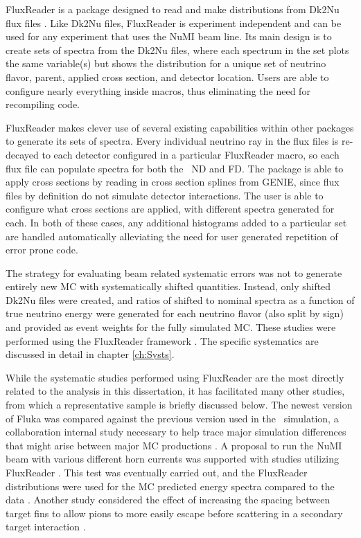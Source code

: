 FluxReader is a package designed to read and make distributions from Dk2Nu flux files \cite{ref:TNFR}. Like Dk2Nu files, FluxReader is experiment independent and can be used for any experiment that uses the NuMI beam line. Its main design is to create sets of spectra from the Dk2Nu files, where each spectrum in the set plots the same variable(s) but shows the distribution for a unique set of neutrino flavor, parent, applied cross section, and detector location. Users are able to configure nearly everything inside macros, thus eliminating the need for recompiling code.

FluxReader makes clever use of several existing capabilities within other packages to generate its sets of spectra. Every individual neutrino ray in the flux files is re-decayed to each detector configured in a particular FluxReader macro, so each flux file can populate spectra for both the \nova~ND and FD. The package is able to apply cross sections by reading in cross section splines from GENIE, since flux files by definition do not simulate detector interactions. The user is able to configure what cross sections are applied, with different spectra generated for each. In both of these cases, any additional histograms added to a particular set are handled automatically alleviating the need for user generated repetition of error prone code.

The strategy for evaluating beam related systematic errors was not to generate entirely new MC with systematically shifted quantities. Instead, only shifted Dk2Nu files were created, and ratios of shifted to nominal spectra as a function of true neutrino energy were generated for each neutrino flavor (also split by sign) and provided as event weights for the fully simulated MC. These studies were performed using the FluxReader framework \cite{ref:TNBeam}. The specific systematics are discussed in detail in chapter \ref{ch:Systs}.

While the systematic studies performed using FluxReader are the most directly related to the analysis in this dissertation, it has facilitated many other studies, from which a representative sample is briefly discussed below. The newest version of Fluka was compared against the previous version used in the \nova~simulation, a collaboration internal study necessary to help trace major simulation differences that might arise between major MC productions \cite{ref:FRFluka}. A proposal to run the NuMI beam with various different horn currents was supported with studies utilizing FluxReader \cite{ref:FRHornProposal}. This test was eventually carried out, and the FluxReader distributions were used for the MC predicted energy spectra compared to the data \cite{ref:FRHornResult}. Another study considered the effect of increasing the spacing between target fins to allow pions to more easily escape before scattering in a secondary target interaction \cite{ref:FRTarget}.

